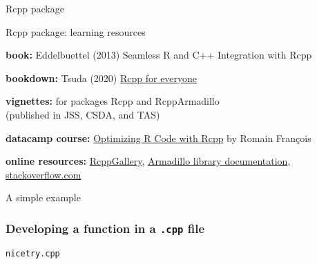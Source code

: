 \documentclass[notes,blackandwhite,mathsans]{beamer}
\begin{document}
{\begin{frame}{Rcpp package}
\end{frame}








\begin{frame}{Rcpp package: learning resources}\small

\bigskip\textbf{book:} {\color{darkgray}Eddelbuettel (2013) Seamless R and C++ Integration with Rcpp}

\bigskip\textbf{bookdown:} {\color{darkgray}Tsuda (2020) \href{https://teuder.github.io/rcpp4everyone_en/}{Rcpp for everyone}}

\bigskip\textbf{vignettes:} {\color{darkgray}for packages} Rcpp {\color{darkgray}and} RcppArmadillo\\ {\color{darkgray}(published in JSS, CSDA, and TAS)}

\bigskip\textbf{datacamp course:} \href{https://learn.datacamp.com/courses/optimizing-r-code-with-rcpp}{\color{darkgray}Optimizing R Code with Rcpp} by Romain Fran\c{c}ois

\bigskip\textbf{online resources:} {\color{darkgray}\href{https://gallery.rcpp.org/}{RcppGallery}, \href{http://arma.sourceforge.net/docs.html}{Armadillo library documentation}, \href{http://stackoverflow.com}{stackoverflow.com}}

\end{frame}









{
\begin{frame}

\begin{adjustwidth}{-0.5cm}{0cm}
\FlushLeft
\vspace{8.0cm}\LARGE
{{\color{black}A simple} {\color{lightgray}example}}
\end{adjustwidth}

\end{frame}
}



\begin{frame}[fragile]
\frametitle{Developing a function in a \texttt{.cpp} file}

\texttt{nicetry.cpp}\\
 

\end{frame}




}
\end{document}
